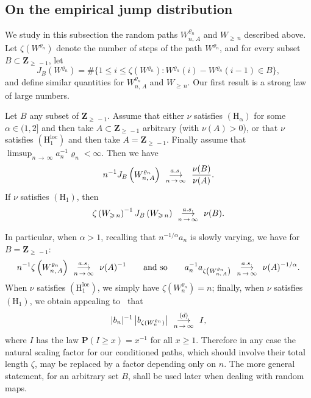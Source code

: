 \documentclass[AHL,Unicode,longabstracts,published]{cedram}
\newcommand{\ensembles}[1]{\mathbf{#1}}
\newcommand{\Z}{\ensembles{Z}}
\renewcommand{\P}{\ensembles{P}}
\newcommand{\1}{\ensembles{1}}
\renewcommand{\le}{\leqslant}
\renewcommand{\ge}{\geqslant}
\newcommand{\Hrm}{\mathrm{H}}
\newcommand{\Hrmloc}{\mathrm{(H_1^{loc})}}
\newcommand{\Hrmalp}{\mathrm{(H_\alpha)}}
\newcommand{\cvloi}[1][n]{\enskip\mathop{\longrightarrow}^{(d)}_{#1\,\to\, \infty}\enskip}
\newcommand{\cvps}[1][n]{\enskip\mathop{\longrightarrow}^{a.s.}_{#1\,\to\, \infty}\enskip}
\begin{document}
\subsection{On the empirical jump distribution}\label{sec:loi_sauts_Luka_stable}

We study in this subsection the random paths $W^{\varrho_n}_{n,\,A}$ and $W_{\ge\,n}$ described above. Let $\zeta(W^{\varrho_n})$ denote the number of steps of the path $W^{\varrho_n}$, and for every subset $B \subset \Z_{\ge\,-1}$, let
\[
J_B\left(W^{\varrho_n}\right) = \#\big\{1 \le i \le \zeta\left(W^{\varrho_n}\right) : W^{\varrho_n}(i) - W^{\varrho_n}(i-1) \in B\big\},
\]
and define similar quantities for $W^{\varrho_n}_{n,\,A}$ and $W_{\ge\,n}$. Our first result is a strong law of large numbers.


\begin{lemm}\label{lem:scaling_GW}
Let $B$ any subset of $\Z_{\ge\,-1}$. Assume that either $\nu$ satisfies $\Hrmalp$ for some $\alpha \in (1, 2]$ and then take $A \subset \Z_{\ge\,-1}$ arbitrary (with $\nu(A) > 0$), or that $\nu$ satisfies $\Hrmloc$ and then take $A = \Z_{\ge\,-1}$. Finally assume that $\limsup_{n \,\to\,\infty} a_n^{-1} \varrho_n < \infty$. Then we have
\[
n^{-1} J_B\left(W^{\varrho_n}_{n,\,A}\right) \cvps \frac{\nu(B)}{\nu(A)}.
\]
If $\nu$ satisfies $(\Hrm_1)$, then
\[
\zeta\left(W_{\ge\,n}\right)^{-1} J_B\left(W_{\ge\,n}\right) \cvps \nu(B).
\]
\end{lemm}

In particular, when $\alpha > 1$, recalling that $n^{-1/\alpha} a_n$ is slowly varying, we have for $B = \Z_{\ge \,-1}$:
\[
n^{-1} \zeta\left(W^{\varrho_n}_{n,\,A}\right) \cvps \nu(A)^{-1}
\qquad\text{and so}\qquad a_n^{-1} a_{\zeta\left(W^{\varrho_n}_{n,\,A}\right)} \cvps \nu(A)^{-1/\alpha}.
\]
When $\nu$ satisfies $\Hrmloc$, we simply have $\zeta(W^{\varrho_n}_n) = n$; finally, when $\nu$ satisfies $(\Hrm_1)$, we obtain appealing to~\cite[Theorem~30]{KR19} that
\[
|b_n|^{-1} \left|b_{\zeta\left(W^{\varrho_n}_n\right)}\right| \cvloi I,
\]
where $I$ has the law $\P(I \ge x) = x^{-1}$ for all $x \ge 1$. Therefore in any case the natural scaling factor for our conditioned paths, which should involve their total length $\zeta$, may be replaced by a factor depending only on $n$. The more general statement, for an arbitrary set $B$, shall be used later when dealing with random maps.
\end{document}
